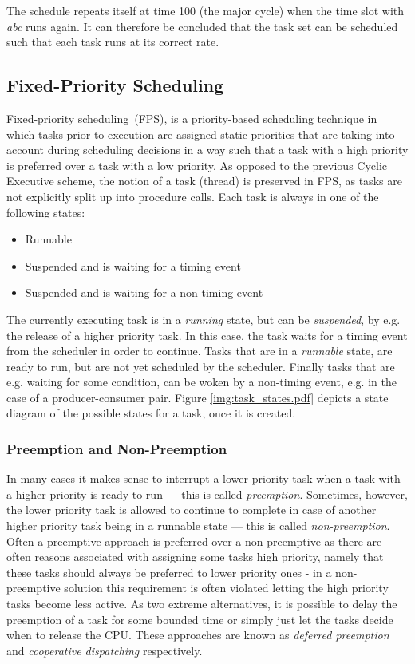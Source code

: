 
The schedule repeats itself at time 100 (the major cycle) when the time slot with \textit{abc} runs again. It can therefore be concluded that the task set can be scheduled such that each task runs at its correct rate. 

\subsection{Fixed-Priority Scheduling}
\label{sub:fps}
Fixed-priority scheduling~(FPS), is a priority-based scheduling technique in which tasks prior to execution are assigned static priorities that are taking into account during scheduling decisions in a way such that a task with a high priority is preferred over a task with a low priority. As opposed to the previous Cyclic Executive scheme, the notion of a task (thread) is preserved in FPS, as tasks are not explicitly split up into procedure calls. Each task is always in one of the following states:

\begin{itemize}
	\item Runnable
	\item Suspended and is waiting for a timing event
	\item Suspended and is waiting for a non-timing event
\end{itemize}

The currently executing task is in a \textit{running} state, but can be \textit{suspended}, by e.g. the release of a higher priority task. In this case, the task waits for a timing event from the scheduler in order to continue. Tasks that are in a \textit{runnable} state, are ready to run, but are not yet scheduled by the scheduler. Finally tasks that are e.g. waiting for some condition, can be woken by a non-timing event, e.g. in the case of a producer-consumer pair. Figure \ref{img:task_states.pdf} depicts a state diagram of the possible states for a task, once it is created.

\subsubsection{Preemption and Non-Preemption}
In many cases it makes sense to interrupt a lower priority task when a task with a higher priority is ready to run --- this is called \textit{preemption}. Sometimes, however, the lower priority task is allowed to continue to complete in case of another higher priority task being in a runnable state --- this is called \textit{non-preemption}. Often a preemptive approach is preferred over a non-preemptive as there are often reasons associated with assigning some tasks high priority, namely that these tasks should always be preferred to lower priority ones - in a non-preemptive solution this requirement is often violated letting the high priority tasks become less active. As two extreme alternatives, it is possible to delay the preemption of a task for some bounded time or simply just let the tasks decide when to release the CPU. These approaches are known as \textit{deferred preemption} and \textit{cooperative dispatching} respectively.

